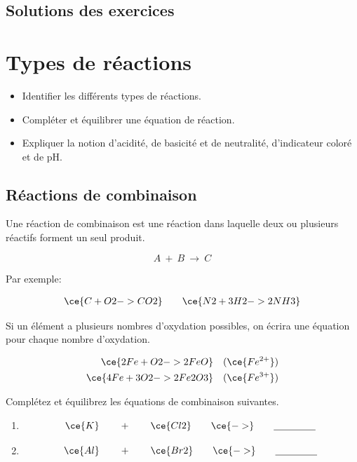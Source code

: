 \documentclass[
  11pt,
  a4paper,
  openany]{book}
\providecommand{\tightlist}{%
  \setlength{\itemsep}{0pt}\setlength{\parskip}{0pt}}
\begin{document}
\newpage

\section{Solutions des exercices} \shipoutAnswer

\chapter{Types de réactions}\label{types-de-ruxe9actions}

\begin{objectives}

\begin{itemize}
\tightlist
\item
  Identifier les différents types de réactions.
\item
  Compléter et équilibrer une équation de réaction.
\item
  Expliquer la notion d'acidité, de basicité et de neutralité, d'indicateur coloré et de pH.
\end{itemize}

\end{objectives}

\section{Réactions de combinaison}\label{ruxe9actions-de-combinaison}

Une réaction de combinaison est une réaction dans laquelle deux ou plusieurs réactifs forment un seul produit.

\[ A\ +\ B\ \longrightarrow\ C \]

Par exemple:

\[ \begin{split}
  \ce{C + O2 -> CO2}
  \end{split}
  \qquad
  \begin{split}
  \ce{N2 + 3H2 -> 2NH3}
  \end{split} \]

Si un élément a plusieurs nombres d'oxydation possibles, on écrira une équation pour chaque nombre d'oxydation.

\[ \begin{split}
  \ce{2Fe + O2 -> 2FeO} \quad (\ce{Fe^{2+}}) \\
  \ce{4Fe + 3O2 -> 2Fe2O3} \quad (\ce{Fe^{3+}})
  \end{split} \]

\begin{Exercise}

Complétez et équilibrez les équations de combinaison suivantes.

\begin{enumerate}
\def\labelenumi{\arabic{enumi}.}
\item
  \[\ce{K} \qquad + \qquad \ce{Cl2} \qquad \ce{->} \qquad\underline{\hspace{1.5cm}}\]
\item
  \[\ce{Al} \qquad + \qquad \ce{Br2} \qquad \ce{->} \qquad\underline{\hspace{1.5cm}}\]
\end{enumerate}

\end{Exercise}
\end{document}
